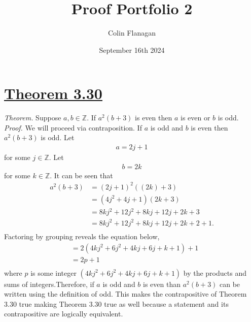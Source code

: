 \documentclass{article}
\title{Proof Portfolio 2}
\author{Colin Flanagan}
\date{September 16th 2024}
\begin{document}
\maketitle

\section*{\underline{Theorem 3.30} }
\textit{Theorem.} Suppose $a,b \in \mathbb{Z}$. If $a^2(b+3)$ is even then $a$ is even or $b$ is odd.\\

\textit{Proof.} We will proceed via contraposition. If $a$ is odd and $b$ is even then $a^2(b+3)$ is odd. Let \\
\begin{align*}
    a = 2j +1 
\end{align*}
for some $j \in \mathbb{Z}$. Let \\
\begin{align*}
    b = 2k
\end{align*}
for some $k \in \mathbb{Z}$. It can be seen that
\begin{align*}
    a^2(b+3) &= (2j+1)^2((2k)+3)\\
    &= (4j^2+4j+1)(2k+3)\\
    &= 8kj^2 + 12j^2 + 8kj + 12j + 2k + 3\\
    &= 8kj^2 + 12j^2 + 8kj + 12j + 2k + 2 + 1.\\
\end{align*}
Factoring by grouping reveals the equation below,
\begin{align*}
    &= 2(4kj^2 + 6j^2 + 4kj + 6j + k + 1) + 1\\
    &= 2p + 1\\
\end{align*}
where $p$ is some integer $(4kj^2 + 6j^2 + 4kj + 6j + k + 1)$ by the products and sums of integers.Therefore, if $a$ is odd and $b$ is even than $a^2(b+3)$ can be written using the definition of odd. This makes the contrapositive of Theorem 3.30 true making Theorem 3.30 true as well because a statement and its contrapositive are logically equivalent.
\end{document}

